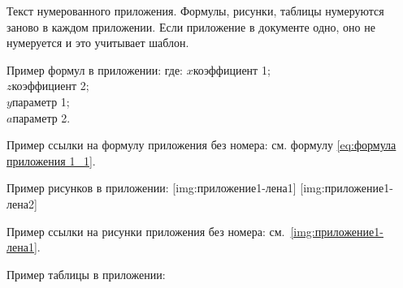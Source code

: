 \newpage{}
\setcounter{equation}{0} %
\setcounter{table}{0} %
\setcounter{illustration}{0} %

Текст нумерованного приложения. Формулы, рисунки, таблицы нумеруются заново в каждом приложении. Если приложение в документе одно, оно не нумеруется и это учитывает шаблон.

Пример формул в приложении:
%
\noindent где: $x$\ndash коэффициент 1; \\
\indent $z$\ndash коэффициент 2;\\
\indent $y$\ndash параметр 1;\\
\indent $a$\ndash параметр 2.

Пример ссылки на формулу приложения без номера: см. формулу \ref{eq:формула приложения 1_1}.

Пример рисунков в приложении:
[img:приложение1-лена1]
[img:приложение1-лена2]

Пример ссылки на рисунки приложения без номера: см.~\ref{img:приложение1-лена1}.

\newpage
Пример таблицы в приложении:

